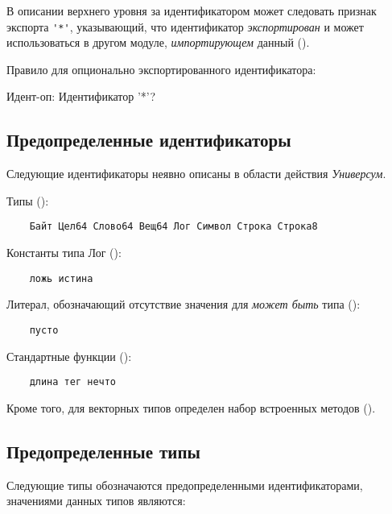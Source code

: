 В описании верхнего уровня за идентификатором может следовать признак экспорта \verb|'*'|, указывающий, что идентификатор \emph{экспортирован} и может использоваться в другом модуле, \emph{импортирующем} данный (). 

\bigskip
Правило для опционально экспортированного идентификатора:
\begin{Grammar}[vspace=2pt]
Идент-оп:  Идентификатор '*'?
\end{Grammar} 

\hypertarget{predefined-idents}{%
\subsection{Предопределенные идентификаторы}\label{decls:predefined-idents}}

Следующие идентификаторы неявно описаны в области действия \emph{Универсум}.
\bigskip

Типы ():
\begin{Verbatim}
    Байт Цел64 Слово64 Вещ64 Лог Символ Строка Строка8
\end{Verbatim}

Константы типа Лог ():
\begin{Verbatim}
    ложь истина
\end{Verbatim}

Литерал, обозначающий отсутствие значения для \emph{может быть} типа ():
\begin{Verbatim}
    пусто
\end{Verbatim}

Стандартные функции ():
\begin{Verbatim}
    длина тег нечто
\end{Verbatim}

Кроме того, для векторных типов определен набор встроенных методов ().

\hypertarget{predefined-types}{%
\subsection{Предопределенные типы}\label{decls:predefined-types}}

Следующие типы обозначаются предопределенными идентификаторами, значениями данных типов являются:

